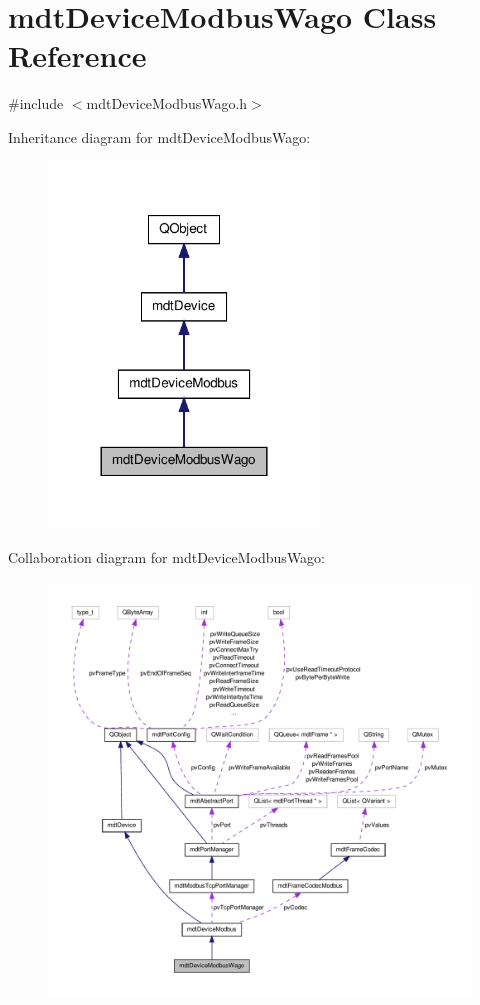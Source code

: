 \hypertarget{classmdt_device_modbus_wago}{\section{mdt\-Device\-Modbus\-Wago Class Reference}
\label{classmdt_device_modbus_wago}
}


{\ttfamily \#include $<$mdt\-Device\-Modbus\-Wago.\-h$>$}



Inheritance diagram for mdt\-Device\-Modbus\-Wago\-:
\nopagebreak
\begin{figure}[H]
\begin{center}
\leavevmode
\includegraphics[width=204pt]{classmdt_device_modbus_wago__inherit__graph}
\end{center}
\end{figure}


Collaboration diagram for mdt\-Device\-Modbus\-Wago\-:
\nopagebreak
\begin{figure}[H]
\begin{center}
\leavevmode
\includegraphics[width=350pt]{classmdt_device_modbus_wago__coll__graph}
\end{center}
\end{figure}
